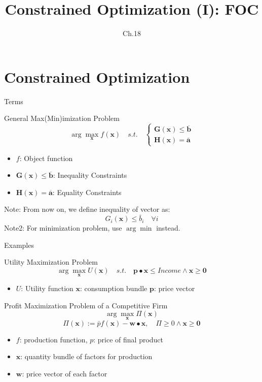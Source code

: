 \documentclass[final]{beamer}
\author[조남운]{\mail}
\title{Constrained Optimization (I): FOC}
\subtitle{Ch.18}
\newcommand{\bd}{\mathbf}
\begin{document}
\maketitle


\section{Constrained Optimization} %
\label{sec:constrained_optimization}
\begin{frame}[t]{Terms}
	\begin{block}
		{General Max(Min)imization Problem}
		\[
			\arg\max_{\bd{x}} f(\bd{x})\quad s.t.\quad \begin{cases}
				\bd{G}(\bd{x})\le\overline{\bd{b}}\\
				\bd{H}(\bd{x})=\overline{\bd{a}}
			\end{cases}
		\]
		\begin{itemize}
			\item $f$: Object function
			\item $\bd{G}(\bd{x})\le\overline{\bd{b}}$: Inequality Constraints
			\item $\bd{H}(\bd{x})=\overline{\bd{a}}$: Equality Constraints
		\end{itemize}
	\end{block}
	Note: From now on, we define inequality of vector as:\[
		G_i(\bd{x}) \le \bar{b}_i\quad \forall i
	\]
	Note2: For minimization problem, use $\arg\min$ instead.
\end{frame}
\begin{frame}[t]{Examples}
	\begin{block}
		{Utility Maximization Problem}
		\[
			\arg\max_{\bd{x}} U(\bd{x})\quad s.t. \quad \bd{p}\bullet \bd{x} \le Income \land \bd{x}\ge \bd{0}
		\]
		\begin{itemize}
			\item $U$: Utility function $\bd{x}$: consumption bundle $\bd{p}$: price vector
		\end{itemize}
	\end{block}
	\begin{block}
		{Profit Maximization Problem of a Competitive Firm}
		\[
			\arg\max_{\bd{x}} \Pi(\bd{x})
		\]\[
			\Pi(\bd{x}) := \bar p f(\bd{x}) - \bd{w}\bullet\bd{x},\quad \Pi\ge 0 \land \bd{x}\ge \bd{0}
		\]
		\begin{itemize}
			\item $f$: production function, $p$: price of final product
			\item $\bd{x}$: quantity bundle of factors for production
			\item $\bd{w}$: price vector of each factor
		\end{itemize}
	\end{block}
\end{frame}
\end{document}
